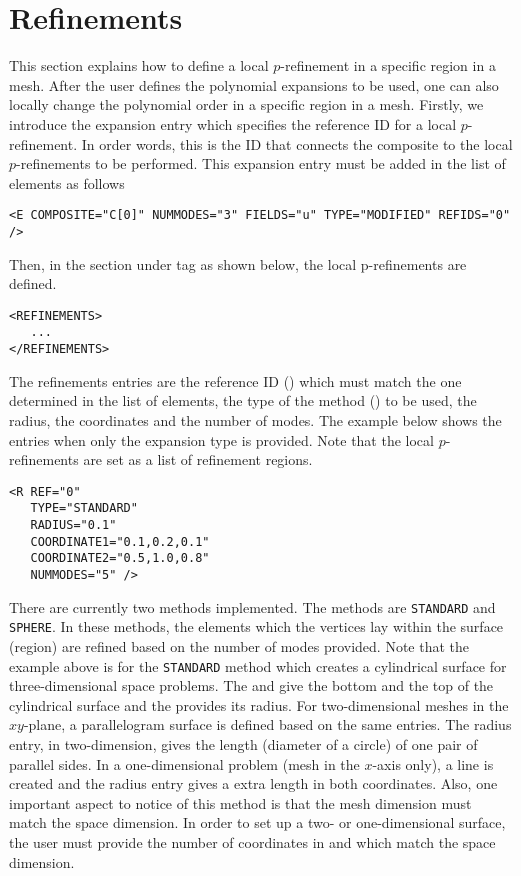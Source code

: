 \section{Refinements}
This section explains how to define a local $p$-refinement in a specific region in a mesh. After the user defines the polynomial expansions to be used, one can also locally change the polynomial order in a specific region in a mesh. Firstly, we introduce the expansion entry  which specifies the reference ID for a local $p$-refinement. In order words, this is the ID that connects the composite to the local $p$-refinements to be performed. This expansion entry must be added in the list of  elements as follows
\begin{lstlisting}[style=XMLStyle]
<E COMPOSITE="C[0]" NUMMODES="3" FIELDS="u" TYPE="MODIFIED" REFIDS="0" />
\end{lstlisting}
Then, in the  section under  tag as shown below, the local p-refinements are defined.
\begin{lstlisting}[style=XMLStyle]
<REFINEMENTS>
   ...
</REFINEMENTS>
\end{lstlisting}

The refinements entries are the reference ID () which must match the one determined in the list of elements, the type of the method () to be used, the radius, the coordinates and the number of modes. The example below shows the entries when only  the expansion type is provided.  Note that the local $p$-refinements are set as a list of  refinement regions. 
\begin{lstlisting}[style=XMLStyle]
<R REF="0" 
   TYPE="STANDARD"
   RADIUS="0.1" 
   COORDINATE1="0.1,0.2,0.1" 
   COORDINATE2="0.5,1.0,0.8" 
   NUMMODES="5" />
\end{lstlisting}

There are currently two methods implemented. The methods are \texttt{STANDARD} and \texttt{SPHERE}.  In these methods, the elements which the vertices lay within the surface (region) are refined based on the number of modes  provided.  Note that the example above is for the \texttt{STANDARD} method which creates a cylindrical surface for three-dimensional space problems. The  and  give the bottom and the top of the cylindrical surface and the  provides its radius. For two-dimensional meshes in the $xy$-plane, a parallelogram surface is defined based on the same entries. The radius entry, in two-dimension, gives the length (diameter of a circle) of one pair of parallel sides. In a one-dimensional problem (mesh in the $x$-axis only), a line is created and the radius entry gives a extra length in both coordinates. Also, one important aspect to notice of this method is that the mesh dimension must match the space dimension. In order to set up a two- or one-dimensional surface, the user must provide the number of coordinates in  and  which match the space dimension.

